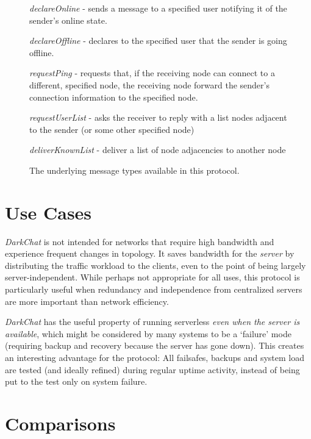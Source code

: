 \documentclass[11pt]{article}
\begin{document}
\begin{figure}
\caption{The underlying message types available in this protocol.}
\begin{description}
\item \emph{declareOnline} - sends a message to a specified user notifying it of the sender's online state.
\item \emph{declareOffline} - declares to the specified user that the sender is going offline.
\item \emph{requestPing} - requests that, if the receiving node can connect to a different, specified node, the receiving node forward the sender's connection information to the specified node.
\item \emph{requestUserList} - asks the receiver to reply with a list nodes adjacent to the sender (or some other specified node)
\item \emph{deliverKnownList} - deliver a list of node adjacencies to another node
\end{description}
\label{protocol}
\end{figure}

\section{Use Cases}

\emph{DarkChat} is not intended for networks that require high bandwidth and experience frequent changes in topology. It saves bandwidth for the \emph{server} by distributing the traffic workload to the clients, even to the point of being largely server-independent. While perhaps not appropriate for all uses, this protocol is particularly useful when redundancy and independence from centralized servers are more important than network efficiency.

\emph{DarkChat} has the useful property of running serverless \emph{even when the server is available}, which might be considered by many systems to be a `failure' mode (requiring backup and recovery because the server has gone down). This creates an interesting advantage for the protocol: All failsafes, backups and system load are tested (and ideally refined) during regular uptime activity, instead of being put to the test only on system failure.

\section{Comparisons}
\end{document}
